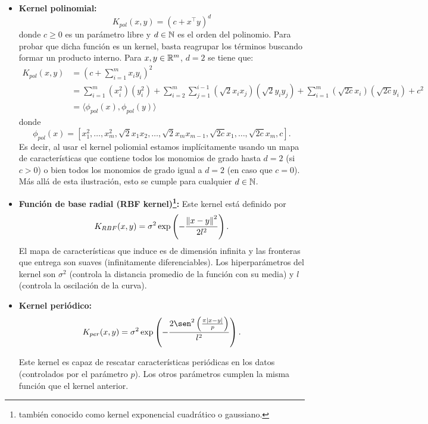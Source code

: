 \begin{itemize}
    \item   \textbf{Kernel polinomial:}
    \begin{equation}
       K_{pol} (x, y) = (c + x^\top y)^d
    \end{equation}
    donde $c\geq 0$ es un parámetro libre y $d\in{\mathbb N}$ es el orden del polinomio. Para probar que dicha función es un kernel, basta reagrupar los términos buscando formar un producto interno. Para $x,y\in\mathbb{R}^m$, $d=2$ se tiene que: 
    \begin{align}
        K_{pol} (x, y)  &= \left(c + \sum_{i=1}^m x_iy_i\right)^2\\
                        &= \sum_{i=1}^m (x_i^2)(y_i^2) + \sum_{i=2}^m \sum_{j=1}^{i-1} (\sqrt{2}x_ix_j)(\sqrt{2}y_iy_j) + \sum_{i=1}^m (\sqrt{2c}x_i)(\sqrt{2c}y_i) + c^2\\
                        &=\langle \phi_{pol}(x) , \phi_{pol}(y) \rangle
    \end{align}
    donde 
    \begin{equation}
        \phi_{pol}(x) = [x_1^2,\ldots,x_m^2,\sqrt{2}x_1x_2,\ldots, \sqrt{2}x_{m}x_{m-1},\sqrt{2c}x_1,\ldots,\sqrt{2c}x_m,c].
    \end{equation}
    Es decir, al usar el kernel poliomial estamos implícitamente usando un mapa de características que contiene todos los monomios de grado hasta $d=2$ (si $c>0$) o bien todos los monomios de grado igual a $d=2$ (en caso que $c=0$). Más allá de esta ilustración, esto se cumple para cualquier $d\in{\mathbb N}$.
    \item \textbf{Función de base radial (RBF kernel)\footnote{también conocido como kernel exponencial cuadrático o gaussiano.}:} Este kernel está definido por
    \begin{equation}
        K_{RBF} (x , y ) = \sigma^2 \exp\left(-\frac{\left\lVert x -y\right\rVert^2}{2l^2}\right).
    \end{equation}
    El mapa de características que induce es de dimensión infinita y las fronteras que entrega son suaves (infinitamente diferenciables). Los hiperparámetros del kernel son $\sigma^2$ (controla la distancia promedio de la función con su media) y $l$ (controla la oscilación de la curva).
        
    \item \textbf{Kernel periódico:}
    \begin{equation}
       K_{per} (x , y) = \sigma^2 \exp\left(- \frac{2\sen^2 \left(\frac{\pi|x -y|}{p}\right)}{l^2}\right).
    \end{equation}
    
    Este kernel es capaz de rescatar características periódicas en los datos (controlados por el parámetro $p$). Los otros parámetros cumplen la misma función que el kernel anterior. 
    
\end{itemize}

